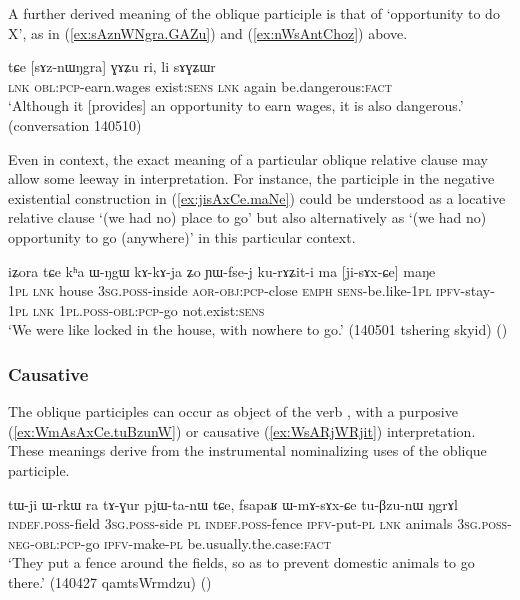 A further derived meaning of the oblique participle is that of `opportunity to do X', as in (\ref{ex:sAznWNgra.GAZu}) and (\ref{ex:nWsAntChoz}) above.

\begin{exe}
\ex \label{ex:sAznWNgra.GAZu}
\gll tɕe [sɤz-nɯŋgra] ɣɤʑu ri, li sɤɣʑɯr \\
\textsc{lnk} \textsc{obl}:\textsc{pcp}-earn.wages exist:\textsc{sens} \textsc{lnk} again be.dangerous:\textsc{fact} \\
\glt `Although it [provides] an opportunity to earn wages, it is also dangerous.' (conversation 140510)
\end{exe}


Even in context, the exact meaning of a particular oblique relative clause may allow some leeway in interpretation. For instance, the participle  in the negative existential construction in (\ref{ex:jisAxCe.maNe}) could be understood as a locative relative clause `(we had no) place to go' but also alternatively as `(we had no) opportunity to go (anywhere)' in this particular context.

\begin{exe}
\ex \label{ex:jisAxCe.maNe}
\gll  iʑora tɕe kʰa ɯ-ŋgɯ kɤ-kɤ-ja ʑo ɲɯ-fse-j ku-rɤʑit-i ma [ji-sɤx-ɕe] maŋe \\
\textsc{1pl} \textsc{lnk} house \textsc{3sg}.\textsc{poss}-inside \textsc{aor}-\textsc{obj}:\textsc{pcp}-close \textsc{emph} \textsc{sens}-be.like-\textsc{1pl} \textsc{ipfv}-stay-\textsc{1pl} \textsc{lnk} \textsc{1pl}.\textsc{poss}-\textsc{obl}:\textsc{pcp}-go not.exist:\textsc{sens} \\
\glt  `We were like locked in the house, with nowhere to go.' (140501 tshering skyid)
()
\end{exe}

\subsubsection{Causative} \label{sec:oblique.participle.causative}
The oblique participles can occur as object of the verb , with a purposive (\ref{ex:WmAsAxCe.tuBzunW}) or causative (\ref{ex:WsARjWRjit}) interpretation. These meanings derive from the instrumental nominalizing uses of the oblique participle. 

\begin{exe}
\ex \label{ex:WmAsAxCe.tuBzunW}
\gll tɯ-ji ɯ-rkɯ ra tɤ-ɣur pjɯ-ta-nɯ tɕe, fsapaʁ ɯ-mɤ-sɤx-ɕe tu-βzu-nɯ ŋgrɤl \\
\textsc{indef}.\textsc{poss}-field \textsc{3sg}.\textsc{poss}-side \textsc{pl} \textsc{indef}.\textsc{poss}-fence \textsc{ipfv}-put-\textsc{pl} \textsc{lnk} animals \textsc{3sg}.\textsc{poss}-\textsc{neg}-\textsc{obl}:\textsc{pcp}-go \textsc{ipfv}-make-\textsc{pl} be.usually.the.case:\textsc{fact} \\
\glt `They put a fence around the fields, so as to prevent domestic animals to go there.' (140427 qamtsWrmdzu) 	()
\end{exe}

